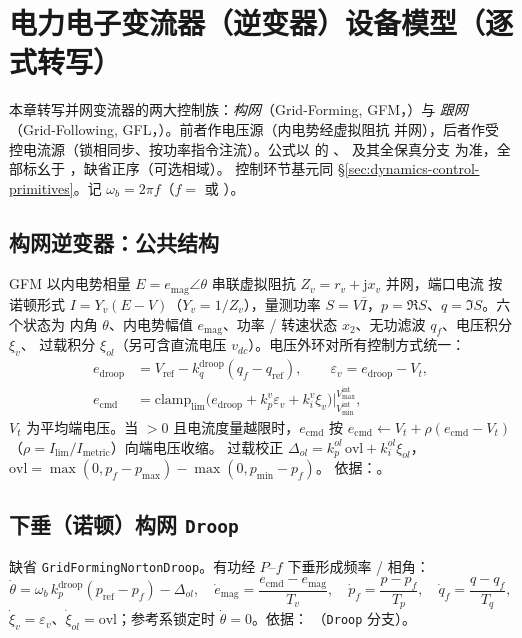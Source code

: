 \section{电力电子变流器（逆变器）设备模型（逐式转写）}
\label{sec:dynamics-device-inverters}

本章转写并网变流器的两大控制族：\emph{构网}（Grid-Forming, GFM，）与
\emph{跟网}（Grid-Following, GFL，）。前者作电压源（内电势经虚拟阻抗
并网），后者作受控电流源（锁相同步、按功率指令注流）。公式以
 的 、
 及其全保真分支
 为准，全部标幺于 ，缺省正序（可选相域）。
控制环节基元同 \S\ref{sec:dynamics-control-primitives}。记 $\omega_b=2\pi f$（$f=$
或 ）。

\subsection{构网逆变器：公共结构}
\label{sec:dynamics-gfm-common}
GFM 以内电势相量 $E=e_{\mathrm{mag}}\angle\theta$ 串联虚拟阻抗 $Z_v=r_v+\mathrm jx_v$ 并网，端口电流
按诺顿形式 $I=Y_v(E-V)$（$Y_v=1/Z_v$），量测功率 $S=V\overline I$，$p=\Re S$、$q=\Im S$。六个状态为
内角 $\theta$、内电势幅值 $e_{\mathrm{mag}}$、功率 / 转速状态 $x_2$、无功滤波 $q_f$、电压积分 $\xi_v$、
过载积分 $\xi_{ol}$（另可含直流电压 $v_{dc}$）。电压外环对所有控制方式统一：
\begin{align}
 e_{\mathrm{droop}}&=V_{\mathrm{ref}}-k_q^{\mathrm{droop}}(q_f-q_{\mathrm{ref}}),\qquad
 \varepsilon_v=e_{\mathrm{droop}}-V_t,\\
 e_{\mathrm{cmd}}&=\mathrm{clamp}_{\mathrm{lim}}\!\Big(e_{\mathrm{droop}}
   +k_p^{v}\varepsilon_v+k_i^{v}\xi_v\Big)\big|_{V_{\min}^{\mathrm{int}}}^{V_{\max}^{\mathrm{int}}},
\end{align}
$V_t$ 为平均端电压。当 $>0$ 且电流度量越限时，$e_{\mathrm{cmd}}$ 按
$e_{\mathrm{cmd}}\leftarrow V_t+\rho(e_{\mathrm{cmd}}-V_t)$（$\rho=I_{\lim}/I_{\mathrm{metric}}$）向端电压收缩。
过载校正 $\Delta_{ol}=k_p^{ol}\,\mathrm{ovl}+k_i^{ol}\xi_{ol}$，$\mathrm{ovl}=\max(0,p_f-p_{\max})-\max(0,p_{\min}-p_f)$。
依据：。

\subsection{下垂（诺顿）构网 \texttt{Droop}}
缺省 \texttt{GridFormingNortonDroop}。有功经 $P$–$f$ 下垂形成频率 / 相角：
\begin{equation}
 \dot\theta=\omega_b\,k_p^{\mathrm{droop}}(p_{\mathrm{ref}}-p_f)-\Delta_{ol},\quad
 \dot e_{\mathrm{mag}}=\frac{e_{\mathrm{cmd}}-e_{\mathrm{mag}}}{T_v},\quad
 \dot p_f=\frac{p-p_f}{T_p},\quad \dot q_f=\frac{q-q_f}{T_q},
\end{equation}
$\dot\xi_v=\varepsilon_v$、$\dot\xi_{ol}=\mathrm{ovl}$；参考系锁定时 $\dot\theta=0$。依据：
（\texttt{Droop} 分支）。

